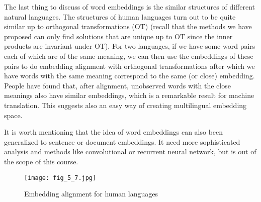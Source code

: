 \documentclass[../main.tex]{subfiles}
\begin{document}
\par The last thing to discuss of word embeddings is the similar structures of different natural languages. The structures of human languages turn out to be quite similar up to orthogonal transformations (OT) (recall that the methods we have proposed can only find solutions that are unique up to OT since the inner products are invariant under OT). For two languages, if we have some word pairs each of which are of the same meaning, we can then use the embeddings of these pairs to do embedding alignment with orthogonal transformations after which we have words with the same meaning correspond to the same (or close) embedding. People have found that, after alignment, unobserved words with the close meanings also have similar embeddings, which is a remarkable result for machine translation. This suggests also an easy way of creating multilingual embedding space.
\par It is worth mentioning that the idea of word embeddings can also been generalized to sentence or document embeddings. It need more sophisticated analysis and methods like convolutional or recurrent neural network, but is out of the scope of this course.
\begin{figure}[h] 
	\centering 
	\texttt{[image: fig\_5\_7.jpg]} 
	\caption{Embedding alignment for human languages}\label{fig_5_7}
\end{figure}
\end{document}
